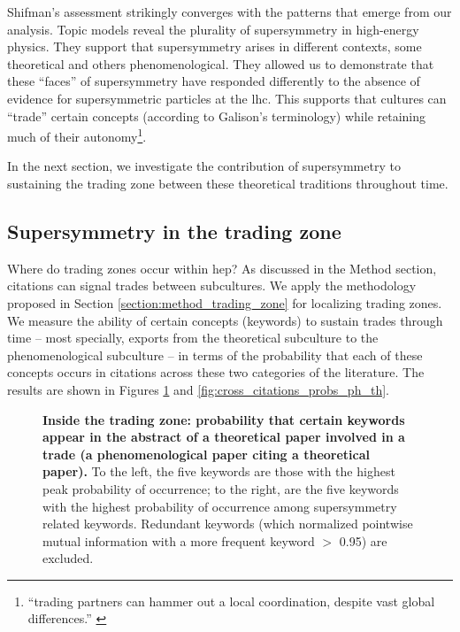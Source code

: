 \documentclass[smallextended]{svjour3}
\begin{document}
Shifman's assessment strikingly converges with the patterns that emerge from our analysis. Topic models reveal the plurality of supersymmetry in high-energy physics. They support that supersymmetry arises in different contexts, some theoretical and others phenomenological. They allowed us to demonstrate that these ``faces'' of supersymmetry have responded differently to the absence of evidence for supersymmetric particles at the \gls{lhc}. This supports that cultures can ``trade'' certain concepts (according to Galison's terminology) while retaining much of their autonomy\footnote{``trading partners can hammer out a local coordination, despite vast global differences.'' \citep[p.~783]{galison1997image}}.


In the next section, we investigate the contribution of supersymmetry to sustaining the trading zone between these theoretical traditions throughout time.

\subsection{Supersymmetry in the trading zone}

Where do trading zones occur within \gls{hep}? As discussed in the Method section, citations can signal trades between subcultures. We apply the methodology proposed in Section \ref{section:method_trading_zone} for localizing trading zones. We measure the ability of certain concepts (keywords) to sustain trades through time -- most specially, exports from the theoretical subculture to the phenomenological subculture -- in terms of the probability that each of these concepts occurs in citations across these two categories of the literature. The results are shown in Figures \ref{fig:cross_citations_probs_th_ph} and \ref{fig:cross_citations_probs_ph_th}.

\begin{figure}
    \centering
    
    \caption{\textbf{Inside the trading zone: probability that certain keywords appear in the abstract of a theoretical paper involved in a trade (a phenomenological paper citing a theoretical paper).} To the left, the five keywords are those with the highest peak probability of occurrence; to the right, are the five keywords with the highest probability of occurrence among supersymmetry related keywords. Redundant keywords (which normalized pointwise mutual information with a more frequent keyword $>$ 0.95) are excluded.} 
    \label{fig:cross_citations_probs_th_ph}
\end{figure}
\end{document}
